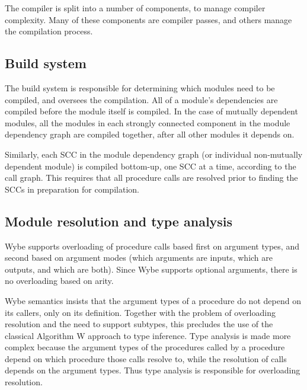 \documentclass{article}
\newcommand{\lang}{\textsf{Wybe}\xspace}
\newcommand{\Lang}{\textsf{Wybe}\xspace}
\begin{document}
The compiler is split into a number of components, to manage compiler
complexity.
Many of these components are compiler passes, and others manage the
compilation process.

\subsection{Build system}
\label{sec:build}

The build system is responsible for determining which modules need to be
compiled, and oversees the compilation.
All of a module's dependencies are compiled before the module itself
is compiled.
In the case of mutually dependent modules, all the modules in each
strongly connected component in the module dependency graph are compiled
together, after all other modules it depends on.

Similarly, each SCC in the module dependency graph
(or individual non-mutually dependent module)
is compiled bottom-up, one SCC at a time, according
to the call graph.
This requires that all procedure calls are resolved prior to finding
the SCCs in preparation for compilation.


\subsection{Module resolution and type analysis}
\label{sec:call-resolution}

\Lang supports overloading of procedure calls based first on argument types,
and second based on argument modes (which arguments are inputs, which are
outputs, and which are both).
Since \lang supports optional arguments, there is no overloading based
on arity.

Wybe semantics insists that the argument types of a procedure do not depend
on its callers, only on its definition.
Together with the problem of overloading resolution and the need to
support subtypes, this precludes the use of
the classical Algorithm W approach to type inference.
Type analysis is made more complex because
the argument types of the procedures called by a procedure
depend on which procedure those calls resolve to, while the resolution
of calls depends on the argument types.
Thus type analysis is responsible for overloading resolution.
\end{document}
